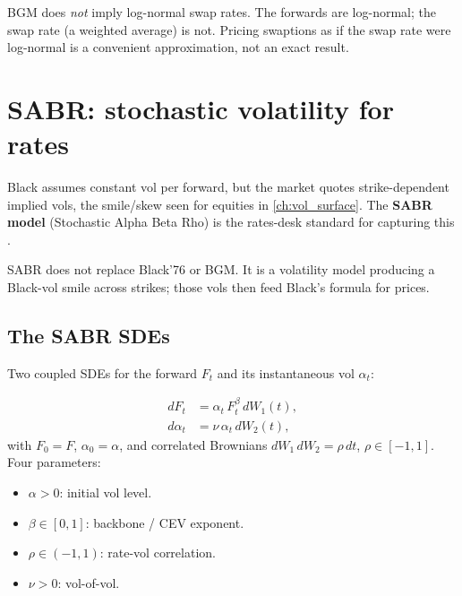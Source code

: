 \begin{pitfallbox}
BGM does \emph{not} imply log-normal swap rates.  The forwards are
log-normal; the swap rate (a weighted average) is not.  Pricing
swaptions as if the swap rate were log-normal is a convenient
approximation, not an exact result.
\end{pitfallbox}


\section{SABR: stochastic volatility for rates}
\label{sec:sabr}

Black assumes constant vol per forward, but the market quotes
strike-dependent implied vols, the smile/skew seen for equities in
\cref{ch:vol_surface}.  The \textbf{SABR model} (Stochastic Alpha
Beta Rho) is the rates-desk standard for capturing this \citeHagan.

SABR does not replace Black'76 or BGM.  It is a volatility model
producing a Black-vol smile across strikes; those vols then feed
Black's formula for prices.

\subsection{The SABR SDEs}

Two coupled SDEs for the forward $F_t$ and its instantaneous vol
$\alpha_t$:

\begin{keyfactbox}
\begin{align}
  dF_t &= \alpha_t\, F_t^{\beta}\, dW_1(t), \label{eq:sabr_F} \\
  d\alpha_t &= \nu\, \alpha_t\, dW_2(t), \label{eq:sabr_alpha}
\end{align}
with $F_0 = F$, $\alpha_0 = \alpha$, and correlated Brownians
$dW_1\,dW_2 = \rho\,dt$, $\rho \in [-1,1]$.  Four parameters:
\begin{itemize}
  \item $\alpha > 0$: initial vol level.
  \item $\beta \in [0,1]$: backbone / CEV exponent.
  \item $\rho \in (-1,1)$: rate-vol correlation.
  \item $\nu > 0$: vol-of-vol.
\end{itemize}
\end{keyfactbox}

